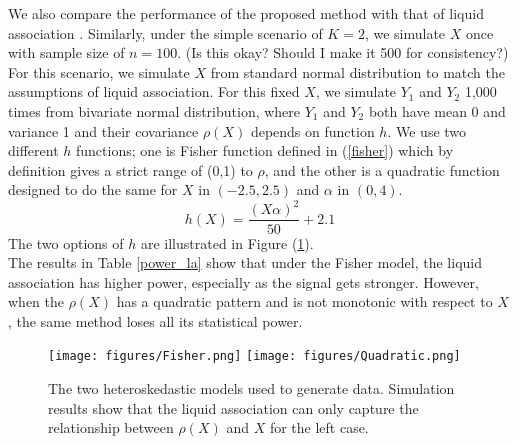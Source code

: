 \documentclass[12pt]{extarticle}
\theoremstyle{theorem}
\begin{document}
We also compare the performance of the proposed method with that of liquid association \cite{li2002genome}. Similarly, under the simple scenario of $K=2$, we simulate $X$ once with sample size of $n=100$. (Is this okay? Should I make it 500 for consistency?) For this scenario, we simulate $X$ from standard normal distribution to match the assumptions of liquid association. For this fixed $X$, we simulate $Y_1$ and $Y_2$ 1,000 times from bivariate normal distribution, where $Y_1$ and $Y_2$ both have mean 0 and variance 1 and their covariance $\rho(X)$ depends on function $h$. We use two different $h$ functions; one is Fisher function defined in (\ref{fisher}) which by definition gives a strict range of (0,1) to $\rho$, and the other is a quadratic function designed to do the same for $X$ in $(-2.5, 2.5)$ and $\alpha$ in $(0,4)$.
$$h(X) = \frac{(X\alpha)^2}{50} + 2.1$$ 
The two options of $h$ are illustrated in Figure (\ref{la_h}).\\

\noindent The results in Table \ref{power_la} show that under the Fisher model, the liquid association has higher power, especially as the signal gets stronger. However, when the $\rho(X)$ has a quadratic pattern and is not monotonic with respect to $X$, the same method loses all its statistical power. 

\begin{figure}[ht]
    \centering
    \texttt{[image: figures/Fisher.png]}
    \texttt{[image: figures/Quadratic.png]}
    \caption{\label{la_h} The two heteroskedastic models used to generate data. Simulation results show that the liquid association can only capture the relationship between $\rho(X)$ and $X$ for the left case.}
\end{figure}
\end{document}
